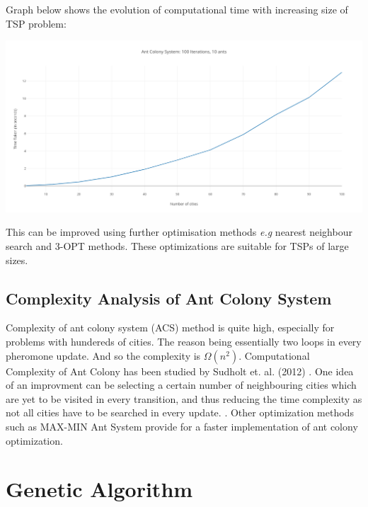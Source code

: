 \documentclass[11pt, english]{article}
\begin{document}
\noindent
Graph below shows the evolution of computational time with increasing size of TSP problem:
\begin{center} \includegraphics[scale=0.2]{ant1.png} \end{center}
\noindent
This can be improved using further optimisation methods \emph{e.g} nearest neighbour search and 3-OPT methods. These optimizations are suitable for TSPs of large sizes. 

\subsection{Complexity Analysis of Ant Colony System}
Complexity of ant colony system (ACS) method is quite high, especially for problems with hundereds of cities. The reason being essentially two loops in every pheromone update. And so the complexity is $\Omega(n^2)$. Computational Complexity of Ant Colony has been studied by Sudholt et. al. (2012) \cite{Sudholt2012}. One idea of an improvment can be selecting a certain number of neighbouring cities which are yet to be visited in every transition, and thus reducing the time complexity as not all cities have to be searched in every update. \cite{neumann2009computational}. Other optimization methods such as MAX-MIN Ant System provide for a faster implementation of ant colony optimization. \cite{Sttzle1998}

\section{Genetic Algorithm}
\end{document}
